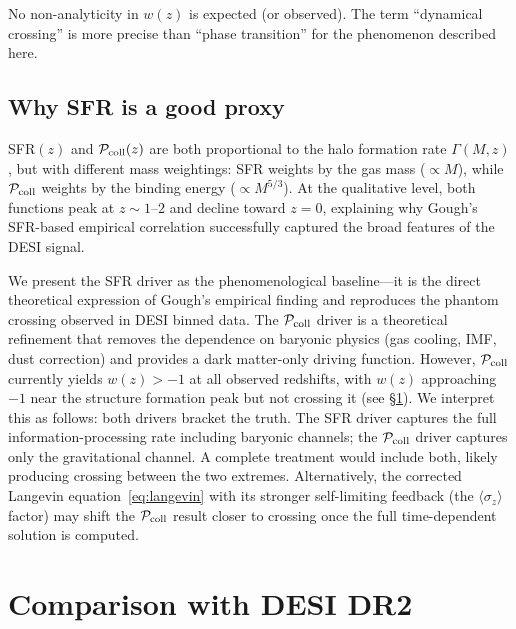 \documentclass[aps,prd,twocolumn,superscriptaddress]{revtex4-2}
\begin{document}
No non-analyticity in $w(z)$ is expected (or observed). The term ``dynamical crossing'' is more precise than ``phase transition'' for the phenomenon described here.

\subsection{Why SFR is a good proxy}
\label{sec:sfrproxy}

SFR$(z)$ and $\mathcal{P}_{\rm coll}(z)$ are both proportional to the halo formation rate $\Gamma(M,z)$, but with different mass weightings: SFR weights by the gas mass ($\propto M$), while $\mathcal{P}_{\rm coll}$ weights by the binding energy ($\propto M^{5/3}$). At the qualitative level, both functions peak at $z \sim 1$--$2$ and decline toward $z=0$, explaining why Gough's SFR-based empirical correlation \cite{Gough:2025} successfully captured the broad features of the DESI signal.

We present the SFR driver as the phenomenological baseline---it is the direct theoretical expression of Gough's empirical finding and reproduces the phantom crossing observed in DESI binned data. The $\mathcal{P}_{\rm coll}$ driver is a theoretical refinement that removes the dependence on baryonic physics (gas cooling, IMF, dust correction) and provides a dark matter-only driving function. However, $\mathcal{P}_{\rm coll}$ currently yields $w(z) > -1$ at all observed redshifts, with $w(z)$ approaching $-1$ near the structure formation peak but not crossing it (see \S\ref{sec:desi}). We interpret this as follows: both drivers bracket the truth. The SFR driver captures the full information-processing rate including baryonic channels; the $\mathcal{P}_{\rm coll}$ driver captures only the gravitational channel. A complete treatment would include both, likely producing crossing between the two extremes. Alternatively, the corrected Langevin equation~\eqref{eq:langevin} with its stronger self-limiting feedback (the $\langle\sigma_z\rangle$ factor) may shift the $\mathcal{P}_{\rm coll}$ result closer to crossing once the full time-dependent solution is computed.

\section{Comparison with DESI DR2}
\label{sec:desi}
\end{document}
